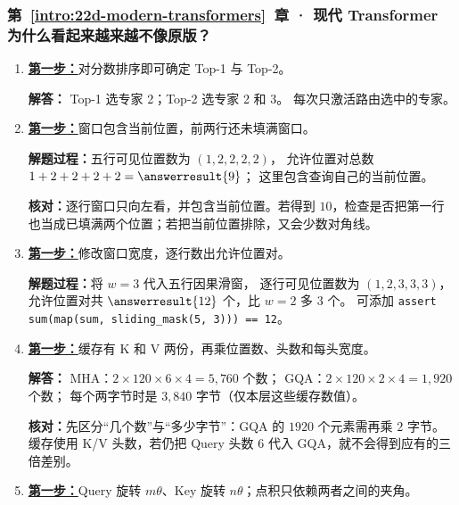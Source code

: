 \subsubsection*{第~\ref*{intro:22d-modern-transformers}~章 · 现代 Transformer 为什么看起来越来越不像原版？}
\begin{enumerate}[label={},leftmargin=4.8em,itemsep=4pt]
\item[\textbf{C-109.}] \leavevmode{}\label{solution:C-109}\label{solution:moe-routing}\hyperref[exercise:moe-routing]{\textbf{第一步：}}对分数排序即可确定 Top-1 与 Top-2。\par\nobreak
\textbf{解答：} Top-1 选专家 2；Top-2 选专家 2 和 3。
每次只激活路由选中的专家。
\item[\textbf{C-110.}] \leavevmode{}\label{solution:C-110}\label{solution:sliding-window-pairs}\hyperref[exercise:sliding-window-pairs]{\textbf{第一步：}}窗口包含当前位置，前两行还未填满窗口。\par\nobreak
\textbf{解题过程：}五行可见位置数为 $(1,2,2,2,2)$，
允许位置对总数 $1+2+2+2+2=\answerresult{9}$；
这里包含查询自己的当前位置。\par\textbf{核对：}逐行窗口只向左看，并包含当前位置。若得到 $10$，检查是否把第一行也当成已填满两个位置；若把当前位置排除，又会少数对角线。
\item[\textbf{C-111.}] \leavevmode{}\label{solution:C-111}\label{solution:sliding-window-code}\hyperref[exercise:sliding-window-code]{\textbf{第一步：}}修改窗口宽度，逐行数出允许位置对。\par\nobreak
\textbf{解题过程：}将 $w=3$ 代入五行因果滑窗，
逐行可见位置数为 $(1,2,3,3,3)$，
允许位置对共 $\answerresult{12}$ 个，比 $w=2$ 多 $3$ 个。
可添加 \texttt{assert sum(map(sum, sliding\_mask(5, 3))) == 12}。
\item[\textbf{C-112.}] \leavevmode{}\label{solution:C-112}\label{solution:gqa-cache-ratio}\hyperref[exercise:gqa-cache-ratio]{\textbf{第一步：}}缓存有 K 和 V 两份，再乘位置数、头数和每头宽度。\par\nobreak
\textbf{解答：} MHA：$2\times120\times6\times4=5{,}760$ 个数；
GQA：$2\times120\times2\times4=1{,}920$ 个数；
每个两字节时是 $3{,}840$ 字节（仅本层这些缓存数值）。\par\textbf{核对：}先区分“几个数”与“多少字节”：GQA 的 $1920$ 个元素需再乘 $2$ 字节。缓存使用 K/V 头数，若仍把 Query 头数 $6$ 代入 GQA，就不会得到应有的三倍差别。
\item[\textbf{C-113.}] \leavevmode{}\label{solution:C-113}\label{solution:rope-relative-position}\hyperref[exercise:rope-relative-position]{\textbf{第一步：}}Query 旋转 $m\theta$、Key 旋转 $n\theta$；点积只依赖两者之间的夹角。\par\nobreak

\end{enumerate}
